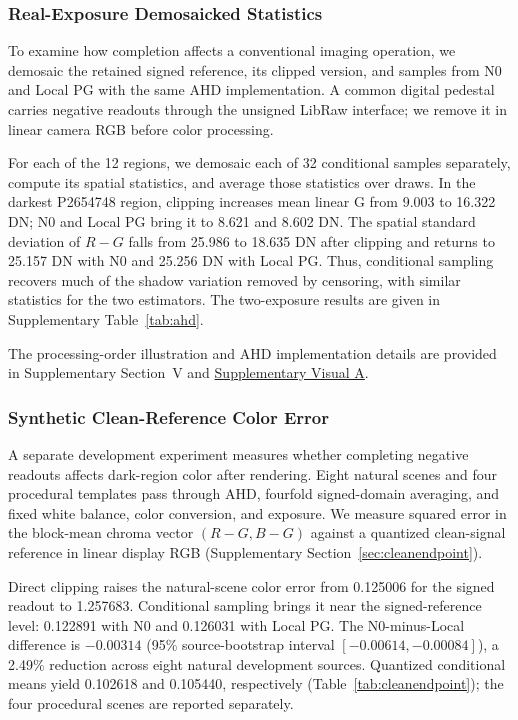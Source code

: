 \documentclass[10pt,twocolumn,journal]{IEEEtran}
\begin{document}
\subsubsection{Real-Exposure Demosaicked Statistics}
To examine how completion affects a conventional imaging operation, we demosaic the retained signed reference, its clipped version, and samples from N0 and Local PG with the same AHD implementation. A common digital pedestal carries negative readouts through the unsigned LibRaw interface; we remove it in linear camera RGB before color processing.

For each of the 12 regions, we demosaic each of 32 conditional samples separately, compute its spatial statistics, and average those statistics over draws. In the darkest P2654748 region, clipping increases mean linear G from 9.003 to 16.322 DN; N0 and Local PG bring it to 8.621 and 8.602 DN. The spatial standard deviation of $R-G$ falls from 25.986 to 18.635 DN after clipping and returns to 25.157 DN with N0 and 25.256 DN with Local PG. Thus, conditional sampling recovers much of the shadow variation removed by censoring, with similar statistics for the two estimators. The two-exposure results are given in Supplementary Table~\ref{tab:ahd}.

The processing-order illustration and AHD implementation details are provided in Supplementary Section~V and \href{visual_en.pdf}{Supplementary Visual A}.

\subsubsection{Synthetic Clean-Reference Color Error}
A separate development experiment measures whether completing negative readouts affects dark-region color after rendering. Eight natural scenes and four procedural templates pass through AHD, fourfold signed-domain averaging, and fixed white balance, color conversion, and exposure. We measure squared error in the block-mean chroma vector $(R-G,B-G)$ against a quantized clean-signal reference in linear display RGB (Supplementary Section~\ref{sec:cleanendpoint}).

Direct clipping raises the natural-scene color error from 0.125006 for the signed readout to 1.257683. Conditional sampling brings it near the signed-reference level: 0.122891 with N0 and 0.126031 with Local PG. The N0-minus-Local difference is $-0.00314$ (95\% source-bootstrap interval $[-0.00614,-0.00084]$), a 2.49\% reduction across eight natural development sources. Quantized conditional means yield 0.102618 and 0.105440, respectively (Table~\ref{tab:cleanendpoint}); the four procedural scenes are reported separately.
\end{document}
